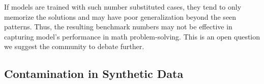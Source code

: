 If models are trained with such number substituted cases, they tend to only memorize the solutions and may have poor generalization beyond the seen patterns.
Thus, the resulting benchmark numbers may not be effective in capturing model's performance in math problem-solving.
This is an open question we suggest the community to debate further.

\subsection{Contamination in Synthetic Data}


